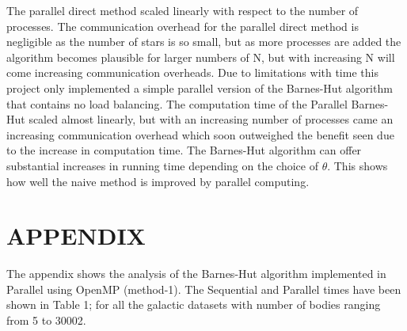 \documentclass[letterpaper, 10 pt, conference]{ieeeconf}
\begin{document}
The parallel direct method scaled linearly with respect to the number of processes. The communication overhead for the parallel direct method is negligible as the number of stars is so small, but as more processes are added the algorithm becomes plausible for larger numbers of N, but with increasing N will come increasing communication overheads. Due to limitations with time this project only implemented a simple parallel version of the Barnes-Hut algorithm that contains no load balancing. The computation time of the Parallel Barnes-Hut scaled almost linearly, but with an increasing number of processes came an increasing communication overhead which soon outweighed the benefit seen due to the increase in computation time. The Barnes-Hut algorithm can offer substantial increases in running time depending on the choice of $\theta$. This shows how well the naive method is improved by parallel computing.


\addtolength{\textheight}{-12cm}   %







\section*{APPENDIX}

The appendix shows the analysis of the Barnes-Hut algorithm implemented in Parallel using OpenMP (method-1). The Sequential and Parallel times have been shown in Table 1; for all the galactic datasets \cite{c4} with number of bodies ranging from 5 to 30002.
\end{document}
